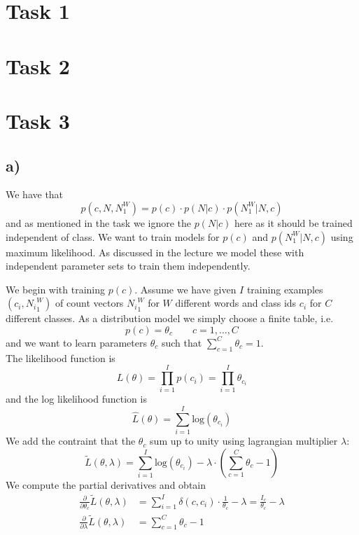 \documentclass[%
   11pt,              %
   ngerman,           %
   a4paper,           %
   DIV11,             %
]{scrartcl}%
\begin{document}
\section*{Task 1}
\section*{Task 2}
\section*{Task 3}
\subsection*{a)}
We have that 
\begin{equation*}
	p(c, N, N_1^W) = p(c) \cdot p(N|c) \cdot p(N_1^W|N,c)
\end{equation*}
and as mentioned in the task we ignore the $p(N|c)$ here as it should be trained independent of class. We want to train models for $p(c)$ and $p(N_1^W|N,c)$ using maximum likelihood. As discussed in the lecture we model these with independent parameter sets to train them independently. \par
We begin with training $p(c)$. Assume we have given $I$ training examples $(c_i, {N_i}_1^W)$ of count vectors ${N_i}_1^W$ for $W$ different words and class ids $c_i$ for $C$ different classes. As a distribution model we simply choose a finite table, i.e.
\begin{equation}\label{const}
	p(c) = \theta_c \qquad c = 1,\ldots,C
\end{equation} 
and we want to learn parameters $\theta_c$ such that $\sum_{c=1}^C \theta_c = 1$. \\
The likelihood function is 
\begin{equation*}
	L(\theta) = \prod_{i=1}^I p(c_i) = \prod_{i=1}^I \theta_{c_i}
\end{equation*}
and the log likelihood function is
\begin{equation*}
	\hat{L}(\theta) = \sum_{i=1}^I \text{log}(\theta_{c_i})
\end{equation*}
We add the contraint that the $\theta_c$ sum up to unity using lagrangian multiplier $\lambda$:
\begin{equation*}
	\tilde{L}(\theta, \lambda) = \sum_{i=1}^I \text{log}(\theta_{c_i}) - \lambda \cdot (\sum_{c=1}^C \theta_c - 1)
\end{equation*}
We compute the partial derivatives and obtain
\begin{align*}
	\frac{\partial}{\partial \theta_c} \tilde{L}(\theta, \lambda) &= \sum_{i=1}^I \delta(c,c_i) \cdot \frac{1}{\theta_c} - \lambda = \frac{I_c}{\theta_c} - \lambda \\
	\frac{\partial}{\partial \lambda} \tilde{L}(\theta, \lambda) &= \sum_{c=1}^C \theta_c - 1
\end{align*}
\end{document}
